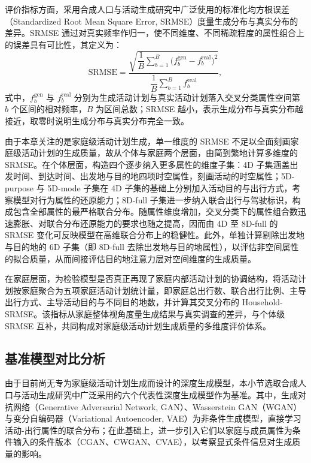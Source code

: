 评价指标方面，采用合成人口与活动生成研究中广泛使用的标准化均方根误差（Standardized Root Mean Square Error, SRMSE）度量生成分布与真实分布的差异。SRMSE 通过对真实频率作归一，使不同维度、不同稀疏程度的属性组合上的误差具有可比性，其定义为：
\begin{equation}
\mathrm{SRMSE}=\frac{\sqrt{\dfrac{1}{B}\sum_{b=1}^{B}\bigl(f_b^{\mathrm{gen}}-f_b^{\mathrm{real}}\bigr)^2}}{\dfrac{1}{B}\sum_{b=1}^{B}f_b^{\mathrm{real}}},
\label{eq.cohact.srmse}
\end{equation}
式中，$f_b^{\mathrm{gen}}$ 与 $f_b^{\mathrm{real}}$ 分别为生成活动计划与真实活动计划落入交叉分类属性空间第 $b$ 个区间的相对频率，$B$ 为区间总数；SRMSE 越小，表示生成分布与真实分布越接近，取零时说明生成分布与真实分布完全一致。

由于本章关注的是家庭级活动计划生成，单一维度的 SRMSE 不足以全面刻画家庭级活动计划的生成质量，故从个体与家庭两个层面，由简到繁地计算多维度的 SRMSE。在个体层面，构造四个逐步纳入更多属性的维度子集：4D 子集涵盖出发时间、到达时间、出发地与目的地四项时空属性，刻画活动的时空属性；5D-purpose 与 5D-mode 子集在 4D 子集的基础上分别加入活动目的与出行方式，考察模型对行为属性的还原能力；8D-full 子集进一步纳入联合出行与驾驶标识，构成包含全部属性的最严格联合分布。随属性维度增加，交叉分类下的属性组合数迅速膨胀、对联合分布还原能力的要求也随之提高，因而由 4D 至 8D-full 的 SRMSE 变化可反映模型在高维联合分布上的稳健性。此外，单独计算剔除出发地与目的地的 6D 子集（即 8D-full 去除出发地与目的地属性），以评估非空间属性的拟合质量，从而间接评估目的地注意力层对空间维度的生成质量。

在家庭层面，为检验模型是否真正再现了家庭内部活动计划的协调结构，将活动计划按家庭聚合为五项家庭活动计划统计量，即家庭总出行数、联合出行比例、主导出行方式、主导活动目的与不同目的地数，并计算其交叉分布的 Household-SRMSE。该指标从家庭整体视角度量生成结果与真实调查的差异，与个体级 SRMSE 互补，共同构成对家庭级活动计划生成质量的多维度评价体系。

\subsection{基准模型对比分析}\label{subsec.cohact.experiment.baseline}

由于目前尚无专为家庭级活动计划生成而设计的深度生成模型，本小节选取合成人口与活动生成研究中广泛采用的六个代表性深度生成模型作为基准。其中，生成对抗网络（Generative Adversarial Network, GAN）、Wasserstein GAN（WGAN）与变分自编码器（Variational Autoencoder, VAE）为非条件生成模型，直接学习活动-出行属性的联合分布；在此基础上，进一步引入它们以家庭与成员属性为条件输入的条件版本（CGAN、CWGAN、CVAE），以考察显式条件信息对生成质量的影响。

